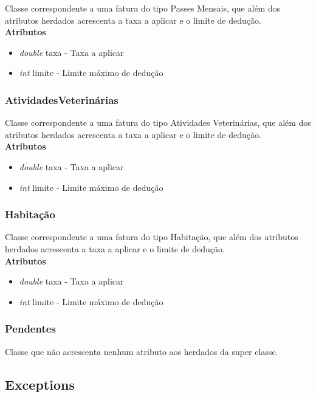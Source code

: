 \documentclass[10pt,a4paper]{article}
\begin{document}
Classe correspondente a uma fatura do tipo Passes Mensais, que além dos atributos herdados acrescenta a taxa a aplicar e o limite de dedução. \\

{\bf{Atributos}}
\begin{itemize}
 \item \textit{double} taxa - Taxa a aplicar
 \item \textit{int} limite - Limite máximo de dedução
\end{itemize}

\subsubsection{AtividadesVeterinárias}

Classe correspondente a uma fatura do tipo Atividades Veterinárias, que além dos atributos herdados acrescenta a taxa a aplicar e o limite de dedução. \\

{\bf{Atributos}}
\begin{itemize}
 \item \textit{double} taxa - Taxa a aplicar
 \item \textit{int} limite - Limite máximo de dedução
\end{itemize}

\subsubsection{Habitação}

Classe correspondente a uma fatura do tipo Habitação, que além dos atributos herdados acrescenta a taxa a aplicar e o limite de dedução. \\

{\bf{Atributos}}
\begin{itemize}
 \item \textit{double} taxa - Taxa a aplicar
 \item \textit{int} limite - Limite máximo de dedução
\end{itemize}

\subsubsection{Pendentes}
Classe que não acrescenta nenhum atributo aos herdados da super classe.

\subsection{Exceptions}
\end{document}
